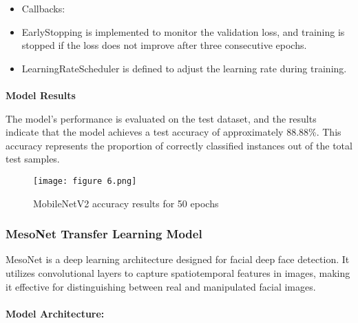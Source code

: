 \documentclass{article}
\begin{document}
\begin{itemize}
    \item Callbacks:
\end{itemize}
\begin{itemize}
    \begin{itemize}
        \item EarlyStopping is implemented to monitor the validation loss, and training is stopped if the loss does not improve after three consecutive epochs.
        \item LearningRateScheduler is defined to adjust the learning rate during training.
    \end{itemize}
\end{itemize}
\paragraph{}
\textbf{Model Results }

The model's performance is evaluated on the test dataset, and the results indicate that the model achieves a test accuracy of approximately 88.88\%. This accuracy represents the proportion of correctly classified instances out of the total test samples.

\begin{figure}[h]
    \centering
    \texttt{[image: figure 6.png]}
    \caption{MobileNetV2 accuracy results for 50 epochs}
    \label{fig:enter-label}
\end{figure}
\subsubsection{MesoNet Transfer Learning Model}

MesoNet is a deep learning architecture designed for facial deep face detection. It utilizes convolutional layers to capture spatiotemporal features in images, making it effective for distinguishing between real and manipulated facial images.
\paragraph{}
\textbf{Model Architecture:}
\end{document}
